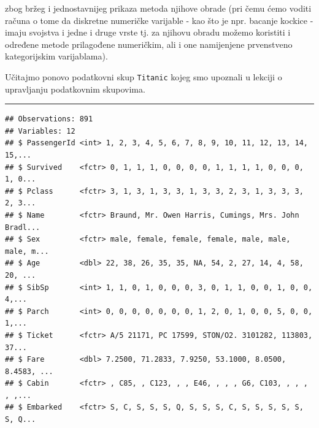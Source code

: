 \documentclass[]{book}
\newenvironment{Shaded}{\begin{snugshade}}{\end{snugshade}}
\newcommand{\KeywordTok}[1]{\textcolor[rgb]{0.13,0.29,0.53}{\textbf{#1}}}
\newcommand{\StringTok}[1]{\textcolor[rgb]{0.31,0.60,0.02}{#1}}
\newcommand{\CommentTok}[1]{\textcolor[rgb]{0.56,0.35,0.01}{\textit{#1}}}
\newcommand{\OperatorTok}[1]{\textcolor[rgb]{0.81,0.36,0.00}{\textbf{#1}}}
\newcommand{\NormalTok}[1]{#1}
\theoremstyle{definition}
\theoremstyle{definition}
\theoremstyle{definition}
\theoremstyle{remark}
\begin{document}
zbog bržeg i jednostavnijeg prikaza metoda njihove obrade (pri čemu ćemo
voditi računa o tome da diskretne numeričke varijable - kao što je npr.
bacanje kockice - imaju svojstva i jedne i druge vrste tj. za njihovu
obradu možemo koristiti i određene metode prilagođene numeričkim, ali i
one namijenjene prvenstveno kategorijskim varijablama).

Učitajmo ponovo podatkovni skup \texttt{Titanic} kojeg smo upoznali u
lekciji o upravljanju podatkovnim skupovima.

\begin{center}\rule{0.5\linewidth}{\linethickness}\end{center}

\begin{Shaded}
\end{Shaded}

\begin{verbatim}
## Observations: 891
## Variables: 12
## $ PassengerId <int> 1, 2, 3, 4, 5, 6, 7, 8, 9, 10, 11, 12, 13, 14, 15,...
## $ Survived    <fctr> 0, 1, 1, 1, 0, 0, 0, 0, 1, 1, 1, 1, 0, 0, 0, 1, 0...
## $ Pclass      <fctr> 3, 1, 3, 1, 3, 3, 1, 3, 3, 2, 3, 1, 3, 3, 3, 2, 3...
## $ Name        <fctr> Braund, Mr. Owen Harris, Cumings, Mrs. John Bradl...
## $ Sex         <fctr> male, female, female, female, male, male, male, m...
## $ Age         <dbl> 22, 38, 26, 35, 35, NA, 54, 2, 27, 14, 4, 58, 20, ...
## $ SibSp       <int> 1, 1, 0, 1, 0, 0, 0, 3, 0, 1, 1, 0, 0, 1, 0, 0, 4,...
## $ Parch       <int> 0, 0, 0, 0, 0, 0, 0, 1, 2, 0, 1, 0, 0, 5, 0, 0, 1,...
## $ Ticket      <fctr> A/5 21171, PC 17599, STON/O2. 3101282, 113803, 37...
## $ Fare        <dbl> 7.2500, 71.2833, 7.9250, 53.1000, 8.0500, 8.4583, ...
## $ Cabin       <fctr> , C85, , C123, , , E46, , , , G6, C103, , , , , ,...
## $ Embarked    <fctr> S, C, S, S, S, Q, S, S, S, C, S, S, S, S, S, S, Q...
\end{verbatim}
\end{document}
